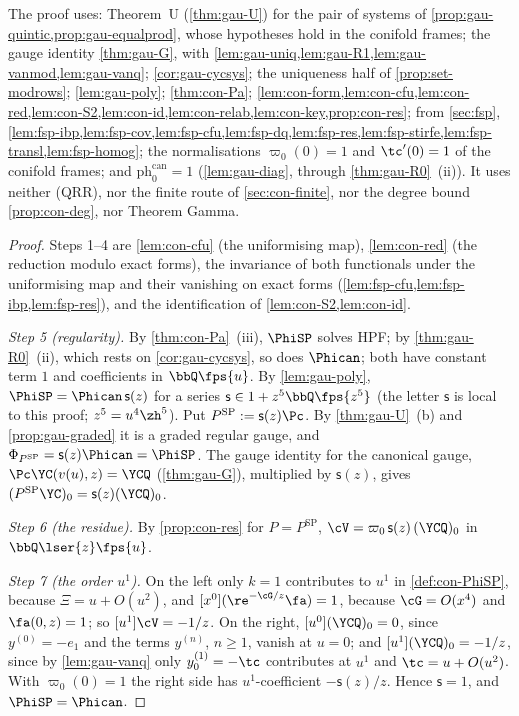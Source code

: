 The proof uses: Theorem~U (\cref{thm:gau-U}) for the pair of systems of \cref{prop:gau-quintic,prop:gau-equalprod}, whose hypotheses hold in the conifold frames; the gauge identity \cref{thm:gau-G}, with \cref{lem:gau-uniq,lem:gau-R1,lem:gau-vanmod,lem:gau-vanq}; \cref{cor:gau-cycsys}; the uniqueness half of \cref{prop:set-modrows}; \cref{lem:gau-poly}; \cref{thm:con-Pa}; \cref{lem:con-form,lem:con-cfu,lem:con-red,lem:con-S2,lem:con-id,lem:con-relab,lem:con-key,prop:con-res}; from \cref{sec:fsp}, \cref{lem:fsp-ibp,lem:fsp-cov,lem:fsp-cfu,lem:fsp-dq,lem:fsp-res,lem:fsp-stirfe,lem:fsp-transl,lem:fsp-homog}; the normalisations $\varpi_0(0)=1$ and $\tc'(0)=1$ of the conifold frames; and $\mathrm{ph}^{\mathrm{can}}_0=1$ (\cref{lem:gau-diag}, through \cref{thm:gau-R0}~(ii)). It uses neither (QRR), nor the finite route of \cref{sec:con-finite}, nor the degree bound \cref{prop:con-deg}, nor Theorem Gamma.

\begin{proof}
Steps 1--4 are \cref{lem:con-cfu} (the uniformising map), \cref{lem:con-red} (the reduction modulo exact forms), the invariance of both functionals under the uniformising map and their vanishing on exact forms (\cref{lem:fsp-cfu,lem:fsp-ibp,lem:fsp-res}), and the identification of \cref{lem:con-S2,lem:con-id}.

\emph{Step 5 (regularity).} By \cref{thm:con-Pa}~(iii), $\PhiSP$ solves HPF; by \cref{thm:gau-R0}~(ii), which rests on \cref{cor:gau-cycsys}, so does $\Phican$; both have constant term $1$ and coefficients in $\bbQ\fps{u}$. By \cref{lem:gau-poly}, $\PhiSP=\Phican\,\mathsf s(z)$ for a series $\mathsf s\in1+z^5\bbQ\fps{z^5}$ (the letter $\mathsf s$ is local to this proof; $z^5=u^4\zh^5$). Put $P^{\mathrm{SP}}:=\mathsf s(z)\Pc$. By \cref{thm:gau-U}~(b) and \cref{prop:gau-graded} it is a graded regular gauge, and $\Phi_{P^{\mathrm{SP}}}=\mathsf s(z)\Phican=\PhiSP$. The gauge identity for the canonical gauge, $\Pc\YC(v(u),z)=\YCQ$ (\cref{thm:gau-G}), multiplied by $\mathsf s(z)$, gives $(P^{\mathrm{SP}}\YC)_0=\mathsf s(z)(\YCQ)_0$.

\emph{Step 6 (the residue).} By \cref{prop:con-res} for $P=P^{\mathrm{SP}}$, $\cV=\varpi_0\,\mathsf s(z)\,(\YCQ)_0$ in $\bbQ\lser{z}\fps{u}$.

\emph{Step 7 (the order $u^1$).} On the left only $k=1$ contributes to $u^1$ in \cref{def:con-PhiSP}, because $\Xi=u+O(u^2)$, and $[x^0](\re^{-\cG/z}\fa)=1$, because $\cG=O(x^4)$ and $\fa(0,z)=1$; so $[u^1]\cV=-1/z$. On the right, $[u^0](\YCQ)_0=0$, since $y^{(0)}=-e_1$ and the terms $y^{(n)}$, $n\geq1$, vanish at $u=0$; and $[u^1](\YCQ)_0=-1/z$, since by \cref{lem:gau-vanq} only $y^{(1)}_0=-\tc$ contributes at $u^1$ and $\tc=u+O(u^2)$. With $\varpi_0(0)=1$ the right side has $u^1$-coefficient $-\mathsf s(z)/z$. Hence $\mathsf s=1$, and $\PhiSP=\Phican$.
\end{proof}

